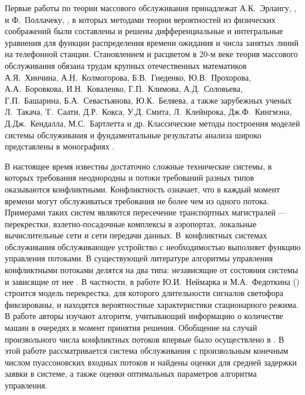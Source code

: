 \documentclass[a4paper,12pt,russian]{extarticle}
\begin{document}
Первые работы по теории массового обслуживания принадлежат А.К.~Эрлангу, \cite{Erlang:1909, Erlang:1917}, и Ф.~Поллачеку, \cite{Pollaczek:1934}, в которых методами теории вероятностей из физических соображений были составлены и решены дифференциальные и интегральные уравнения для функции распределения времени ожидания и числа занятых линий на телефонной станции. 
Становлением и расцветом в 20-м веке теория массового обслуживания обязана трудам крупных отечественных математиков 
А.Я.~Хинчина, А.Н.~Колмогорова, Б.В.~Гнеденко, Ю.В.~Прохорова, А.А.~Боровкова, И.Н.~Коваленко, Г.П.~Климова, А.Д.~Соловьева, Г.П.~Башарина, Б.А.~Севастьянова, Ю.К.~Беляева,
а также зарубежных ученых Л.~Такача, T.~Саати, Д.Р.~Кокса, У.Д. Смита, Л.~Клейнрока, Дж.Ф.~Кингмэна, Д.Дж.~Кендалла, М.С.~Бартлетта и др. 
Классические методы построения моделей системы обслуживания и фундаментальные результаты анализа широко представлены в монографиях \cite{Hinchin:2010, Klimov:1966, Gnedenko:2012, Saati:1971, Bocharov:1995, Asmussen:2008, Borovkov:1972, Borovkov:1980}.

В настоящее время известны достаточно сложные технические системы, в которых требования неоднородны и потоки требований разных типов оказываются конфликтными. Конфликтность означает, что в каждый момент времени могут обслуживаться требования не более чем из одного потока. Примерами таких систем являются пересечение транспортных магистралей --- перекрестки, взлетно-посадочные комплексы в аэропортах, локальные вычислительные сети и сети передачи данных. В~конфликтных системах обслуживания обслуживающее устройство с необходимостью выполняет функцию управления потоками. В существующей литературе алгоритмы управления конфликтными потоками делятся на два типа: независящие от состояния системы \cite{Darroch:1964,Neymark:Fedotkin:1967} и зависящие от нее \cite{Neymark:Fedotkin:1968, Fedotkin:1976, Ferguson:1985, Takagi:1985}. В частности, в работе Ю.И.~Неймарка и М.А.~Федоткина (\cite{Neymark:Fedotkin:1967}) строится модель перекрестка, для которого длительности сигналов светофора фиксированы, и находятся вероятностные характеристики стационарного режима. В работе \cite{Neymark:Fedotkin:1968} авторы изучают алгоритм, учитывающий информацию о количестве машин в очередях в момент принятия решения. Обобщение на случай произвольного числа конфликтных потоков впервые было осуществлено в \cite{Yakushev:1990}. В этой работе рассматривается система обслуживания с произвольным конечным числом пуассоновских входных потоков и найдены оценки для средней задержки заявки в системе, а также оценки оптимальных параметров алгоритма управления. 
\end{document}
